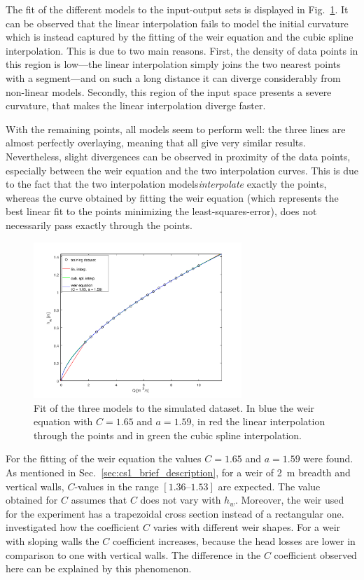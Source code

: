 The fit of the different models to the input-output sets is displayed in Fig.~\ref{fig:fitting_results}.
It can be observed that the linear interpolation fails to model the initial curvature which is instead captured by the fitting of the weir equation and the cubic spline interpolation.
This is due to two main reasons. 
First, the density of data points in this region is low---the linear interpolation simply joins the two nearest points with a segment---and on such a long distance it can diverge considerably from non-linear models.
Secondly, this region of the input space presents a severe curvature, that makes the linear interpolation diverge faster.

With the remaining points, all models seem to perform well: the three lines are almost perfectly overlaying, meaning that all give very similar results.
Nevertheless, slight divergences can be observed in proximity of the data points, especially between the weir equation and the two interpolation curves. This is due to the fact that the two interpolation models\emph{interpolate} exactly the points, whereas the curve obtained by fitting the weir equation (which represents the best linear fit to the points minimizing the least-squares-error), does not necessarily pass exactly through the points.

\begin{figure}[h]
  \centering
  \includegraphics[width=0.7\textwidth]{Figures/fitting_results.png}
  \caption{Fit of the three models to the simulated dataset. In blue the weir equation with $C = \num{1.65}$ and $a = \num{1.59}$, in red the linear interpolation through the points and in green the cubic spline interpolation.}
  \label{fig:fitting_results}
\end{figure}

For the fitting of the weir equation the values $C = 1.65$ and $a = 1.59$ were found.
As mentioned in Sec.~\ref{sec:cs1_brief_description}, for a weir of \SI{2}{\m} breadth and vertical walls, $C$-values in the range $[\numrange{1.36}{1.53}]$ are expected.
The value obtained for $C$ assumes that $C$ does not vary with $h_w$.
Moreover, the weir used for the experiment has a trapezoidal cross section instead of a rectangular one.
\cite{tracy_discharge_1957} investigated how the coefficient $C$ varies with different weir shapes.
For a weir with sloping walls the $C$ coefficient increases, because the head losses are lower in comparison to one with vertical walls.
The difference in the $C$ coefficient observed here can be explained by this phenomenon.\\

